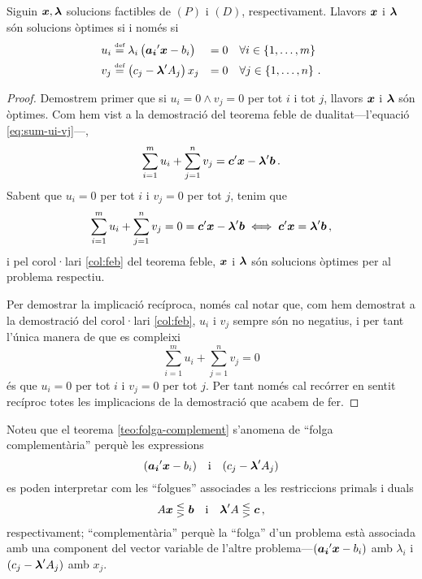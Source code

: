 \begin{teo}\label{teo:folga-complement}
	Siguin $\boldsymbol{x}, \boldsymbol{\lambda}$ solucions factibles de $\left(P\right)$ i
	$\left(D\right)$, respectivament. Llavors $\boldsymbol{x}$ i $\boldsymbol{\lambda}$ són
	solucions òptimes si i només si
	\begin{alignat*}{2}{}
	u_i &\stackrel{\text{\tiny def}}{=} \lambda_i \left(\boldsymbol{a_i}'\boldsymbol{x} - b_i\right) &= 0 &\quad
	\forall i \in \left\{1, \dots, m\right\} \\
	v_j &\stackrel{\text{\tiny def}}{=} \left(c_j - \boldsymbol{\lambda}'A_j\right) x_j &= 0 &\quad \forall
	j \in \left\{1, \dots, n\right\}\,.
	\end{alignat*}
	\begin{proof}
		Demostrem primer que si $u_i = 0 \land v_j = 0$ per tot $i$ i tot $j$,
		llavors $\boldsymbol{x}$ i $\boldsymbol{\lambda}$ són òptimes. Com hem vist a la 
		demostració del
		teorema feble de dualitat---l'equació \eqref{eq:sum-ui-vj}---, 
		\begin{equation*}
		\sum_{i = 1}^{m} u_i + \sum_{j = 1}^{n} v_j = \boldsymbol{c}'\boldsymbol{x} -
		\boldsymbol{\lambda}'\boldsymbol{b}\,.
		\end{equation*}
		Sabent que $u_i = 0$ per tot $i$ i $v_j = 0$ per tot $j$, tenim que
		\[\sum_{i = 1}^{m} u_i + \sum_{j = 1}^{n} v_j = 0 = \boldsymbol{c}'\boldsymbol{x} -
		\boldsymbol{\lambda}'\boldsymbol{b} \iff \boldsymbol{c}'\boldsymbol{x} = \boldsymbol{\lambda}'\boldsymbol{b}\,,  \] i 
		pel
		corol·lari \ref{col:feb} del teorema feble, $\boldsymbol{x}$ i $\boldsymbol{\lambda}$ 
		són
		solucions òptimes per al problema respectiu.
		
		Per demostrar la implicació recíproca, només cal notar que, com hem
		demostrat a la demostració del corol·lari \ref{col:feb}, $u_i$ i $v_j$ 
		sempre
		són no negatius, i per tant l'única manera de que es compleixi 
		\[\sum_{i=1}^{m}
		u_i + \sum_{j=1}^{n} v_j = 0 \] és que $u_i = 0$ per tot $i$ i $v_j = 
		0$ per tot
		$j$. Per tant només cal recórrer en sentit recíproc totes les 
		implicacions de la
		demostració que acabem de fer.
	\end{proof}
\end{teo}

Noteu que el teorema \ref{teo:folga-complement} s'anomena de ``folga
complementària'' perquè les expressions \[(\boldsymbol{a_i}'\boldsymbol{x}-b_i) \quad
\text{i}\quad (c_j-\boldsymbol{\lambda}'A_j) \] es poden interpretar com les ``folgues''
associades a les restriccions primals i duals \[A\boldsymbol{x} \lesseqgtr \boldsymbol{b} \quad
\text{i}\quad \boldsymbol{\lambda}'A \lesseqgtr \boldsymbol{c}\,,\] respectivament;
``complementària'' perquè la ``folga'' d'un problema està associada amb una
component del vector variable de l'altre problema---$(\boldsymbol{a_i}'\boldsymbol{x}-b_i)$ amb
$\lambda_i$ i $(c_j-\boldsymbol{\lambda}'A_j)$ amb $x_j$.

